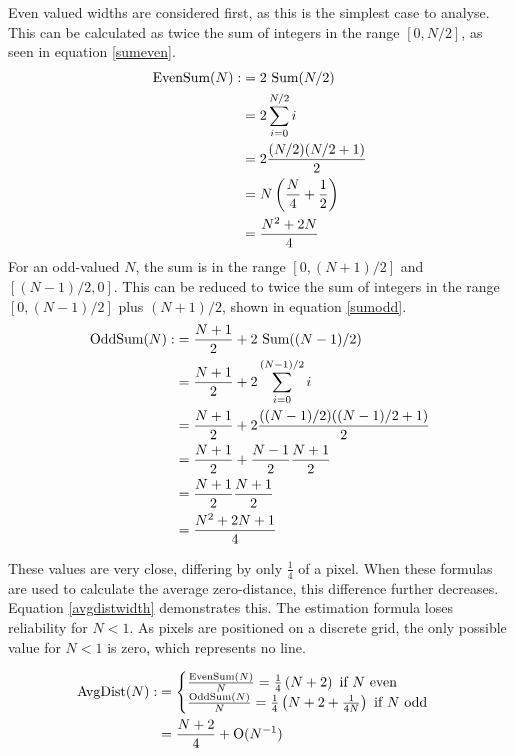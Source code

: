 \documentclass[../main.tex]{subfiles}
\begin{document}
    Even valued widths are considered first, as this is the simplest case to analyse.
    This can be calculated as twice the sum of integers in the range $[0,N/2]$, as seen in equation \ref{sumeven}.
    \begin{align}
      \text{EvenSum}(N):&=2\text{ Sum}(N/2)\notag\\
                        &=2\sum_{i=0}^{N/2}i\notag\\
                        &=2\frac{(N/2)(N/2+1)}{2}\notag\\
                        &=N\left(\frac{N}{4}+\frac{1}{2}\right)\notag\\
                        &=\frac{N^2+2N}{4}\
      \label{sumeven}
    \end{align}
    For an odd-valued $N$, the sum is in the range $[0,(N+1)/2]$ and $[(N-1)/2,0]$.
    This can be reduced to twice the sum of integers in the range $[0,(N-1)/2]$ plus $(N+1)/2$, shown in equation \ref{sumodd}.
    \begin{align}
      \text{OddSum}(N):&=\frac{N+1}{2}+2\text{ Sum}((N-1)/2)\notag\\
                        &=\frac{N+1}{2}+2\sum_{i=0}^{(N-1)/2}i\notag\\
                        &=\frac{N+1}{2}+2\frac{((N-1)/2)((N-1)/2+1)}{2}\notag\\
                        &=\frac{N+1}{2}+\frac{N-1}{2}\frac{N+1}{2}\notag\\
                        &=\frac{N+1}{2}\frac{N+1}{2}\notag\\
                        &=\frac{N^2+2N+1}{4}
      \label{sumodd}
    \end{align}

    These values are very close, differing by only $\frac{1}{4}$ of a pixel.
    When these formulas are used to calculate the average zero-distance, this difference further decreases.
    Equation \ref{avgdistwidth} demonstrates this.
    The estimation formula loses reliability for $N<1$. 
    As pixels are positioned on a discrete grid, the only possible value for $N<1$ is zero, which represents no line.

    \begin{align}
     \text{AvgDist}(N) :&=
        \begin{cases}
          \frac{\text{EvenSum}(N)}{N} =\frac{1}{4}\left(N+2\right) \text{ if } N \text{ even}\\
          \frac{\text{OddSum}(N)}{N} =\frac{1}{4}\left(N+2+\frac{1}{4N}\right) \text{ if } N \text{ odd}
        \end{cases}\notag\\
      &= \frac{N+2}{4} + \text{O}(N^{-1})
      \label{avgdistwidth}
    \end{align}
\end{document}
